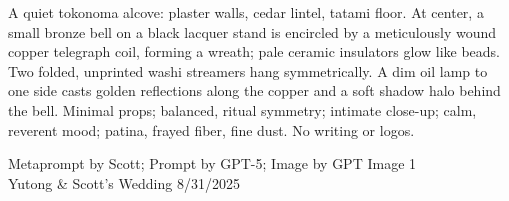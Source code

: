 \documentclass[12pt]{article}
\begin{document}
\noindent
\begin{adjustbox}{max size={\textwidth}{\textheight}}
\begin{varwidth}{\textwidth}
\RaggedRight
\footnotesize
A quiet tokonoma alcove: plaster walls, cedar lintel, tatami floor. At center, a small bronze bell on a black lacquer stand is encircled by a meticulously wound copper telegraph coil, forming a wreath; pale ceramic insulators glow like beads. Two folded, unprinted washi streamers hang symmetrically. A dim oil lamp to one side casts golden reflections along the copper and a soft shadow halo behind the bell. Minimal props; balanced, ritual symmetry; intimate close-up; calm, reverent mood; patina, frayed fiber, fine dust. No writing or logos.
\end{varwidth}
\end{adjustbox}
\vfill
{\raggedleft\footnotesize
Metaprompt by Scott; Prompt by GPT-5; Image by GPT Image 1 \\
Yutong \& Scott's Wedding 8/31/2025\par}
\end{document}
